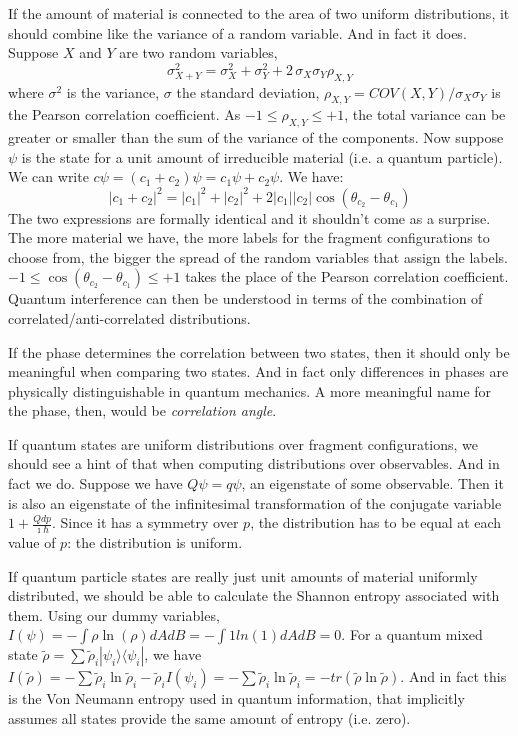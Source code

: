 \documentclass[smallextended]{svjour3}
\numberwithin{equation}{section}
\theoremstyle{definition}
\begin{document}
If the amount of material is connected to the area of two uniform distributions, it should combine like the variance of a random variable. And in fact it does. Suppose $X$ and $Y$ are two random variables,
\begin{equation}\label{eqn:correlation}
\sigma^2_{X+Y} = \sigma^2_{X} + \sigma^2_{Y} + 2 \, \sigma_{X} \sigma_{Y} \rho_{X,Y}
\end{equation}
where $\sigma^2$ is the variance, $\sigma$ the standard deviation, $\rho_{X,Y}= COV(X,Y)/\sigma_{X} \sigma_{Y}$ is the Pearson correlation coefficient. As $-1\leq\rho_{X,Y}\leq+1$, the total variance can be greater or smaller than the sum of the variance of the components. Now suppose $\psi$ is the state for a unit amount of irreducible material (i.e. a quantum particle). We can write $c \psi = (c_1 + c_2) \psi = c_1 \psi + c_2 \psi$. We have:
\begin{equation}\label{eqn:correlation_state}
|c_1+c_2|^2=|c_1|^2 + |c_2|^2 + 2 |c_1||c_2|\cos(\theta_{c_2} - \theta_{c_1})
\end{equation}
The two expressions are formally identical and it shouldn't come as a surprise. The more material we have, the more labels for the fragment configurations to choose from, the bigger the spread of the random variables that assign the labels. $-1\leq\cos(\theta_{c_2} - \theta_{c_1})\leq+1$ takes the place of the Pearson correlation coefficient. Quantum interference can then be understood in terms of the combination of correlated/anti-correlated distributions.

If the phase determines the correlation between two states, then it should only be meaningful when comparing two states. And in fact only differences in phases are physically distinguishable in quantum mechanics. A more meaningful name for the phase, then, would be \emph{correlation angle}.

If quantum states are uniform distributions over fragment configurations, we should see a hint of that when computing distributions over observables. And in fact we do. Suppose we have $Q\psi = q \psi$, an eigenstate of some observable. Then it is also an eigenstate of the infinitesimal transformation of the conjugate variable $1+\frac{Qdp}{\imath\hbar}$. Since it has a symmetry over $p$, the distribution has to be equal at each value of $p$: the distribution is uniform.

If quantum particle states are really just unit amounts of material uniformly distributed, we should be able to calculate the Shannon entropy associated with them. Using our dummy variables, $I(\psi) = - \int \rho \ln (\rho) dA dB = - \int 1 ln (1) dA dB = 0$. For a quantum mixed state $\tilde{\rho} = \sum \tilde{\rho}_i |\psi_i\rangle \langle \psi_i |$, we have $I(\tilde{\rho}) = - \sum \tilde{\rho}_i \ln \tilde{\rho}_i - \tilde{\rho}_i I(\psi_i) = - \sum \tilde{\rho}_i \ln \tilde{\rho}_i = -tr(\tilde{\rho} \ln \tilde{\rho})$. And in fact this is the Von Neumann entropy used in quantum information, that implicitly assumes all states provide the same amount of entropy (i.e. zero).
\end{document}
